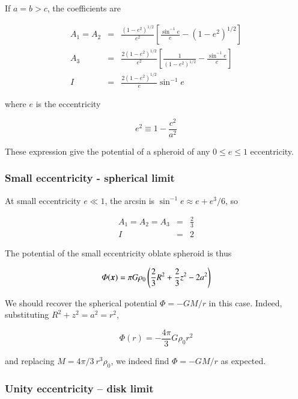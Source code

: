 If $a=b > c$, the coefficients are 

\begin{eqnarray}
A_1 = A_2 &=& \frac{(1-e^2)^{1/2}}{e^2}\left[\frac{\sin^{-1} e}{e} -(1-e^2)^{1/2}\right]\\
A_3&=&\frac{2(1-e^2)^{1/2}}{e^2}\left[\frac{1}{(1-e^2)^{1/2}} - \frac{\sin^{-1} e}{e}\right]\\
I &=& \frac{2(1-e^2)^{1/2}}{e}\sin^{-1} e
\end{eqnarray}

where $e$ is the eccentricity

\begin{equation}
e^2\equiv 1-\frac{c^2}{a^2} 
\end{equation}


These expression give the potential of a spheroid of any $0\leq e \leq 1$ eccentricity.


\subsubsection{Small eccentricity - spherical limit}

At small eccentricity $e \ll 1$, the arcsin is $\sin^{-1} e \approx e + e^3/6$, so 

\begin{eqnarray}
A_1=A_2=A_3 &=& \frac{2}{3}\\
I &=& 2
\end{eqnarray}

The potential of the small eccentricity oblate spheroid is thus 

\begin{equation}
\varPhi({\boldsymbol{x}}) = \pi G \rho_0 \left(\frac{2}{3} R^2 + \frac{2}{3} z^2 - 2a^2 \right) 
\end{equation}

We should recover the spherical potential $\varPhi=-GM/r$ in this case. Indeed, substituting $R^2+z^2=a^2=r^2$, 


\begin{equation}
\varPhi(r) = -\frac{4\pi}{3} G \rho_0 r^2  
\end{equation}

and replacing $M = 4\pi/3 \  r^3\rho_0 $, we indeed find $\varPhi=-GM/r$ as expected. 

\subsubsection{Unity eccentricity -- disk limit}

